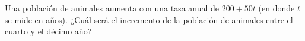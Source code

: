 \item Una población de animales aumenta con una tasa anual de $200 + 50t$ (en donde $t$ se mide en años). ¿Cuál será el incremento de la población de animales entre el cuarto y el décimo año?
